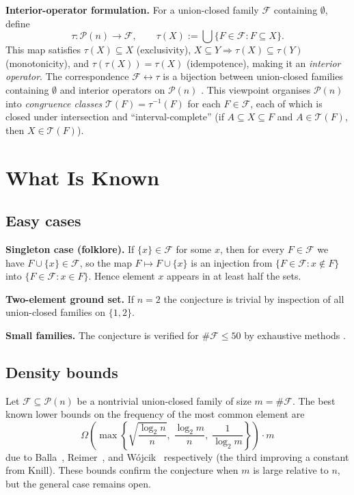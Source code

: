 \documentclass[11pt]{article}
\theoremstyle{definition}
\theoremstyle{remark}
\newcommand{\F}{\mathcal{F}}
\newcommand{\Pow}{\mathcal{P}}
\begin{document}
\textbf{Interior-operator formulation.}
For a union-closed family $\F$ containing $\emptyset$, define
\[
  \tau : \Pow(n) \to \F, \qquad \tau(X) := \bigcup\{F \in \F : F \subseteq X\}.
\]
This map satisfies $\tau(X) \subseteq X$ (exclusivity),
$X \subseteq Y \Rightarrow \tau(X)\subseteq\tau(Y)$ (monotonicity),
and $\tau(\tau(X)) = \tau(X)$ (idempotence), making it an
\emph{interior operator}.
The correspondence $\F \leftrightarrow \tau$ is a bijection between
union-closed families containing $\emptyset$ and interior operators on
$\Pow(n)$ \cite{nagel2023}.
This viewpoint organises $\Pow(n)$ into \emph{congruence classes}
$\mathcal{T}(F) = \tau^{-1}(F)$ for each $F \in \F$, each of which is
closed under intersection and ``interval-complete'' (if $A \subseteq X \subseteq F$
and $A \in \mathcal{T}(F)$, then $X \in \mathcal{T}(F)$).

\section{What Is Known}

\subsection{Easy cases}
\label{sec:easy}

\textbf{Singleton case (folklore).}
If $\{x\} \in \F$ for some $x$, then for every $F \in \F$ we have
$F \cup \{x\} \in \F$, so the map $F \mapsto F \cup \{x\}$ is an
injection from $\{F \in \F : x \notin F\}$ into $\{F \in \F : x \in F\}$.
Hence element $x$ appears in at least half the sets.

\textbf{Two-element ground set.}
If $n = 2$ the conjecture is trivial by inspection of all union-closed
families on $\{1,2\}$.

\textbf{Small families.}
The conjecture is verified for $\#\F \le 50$ by exhaustive methods
\cite{bruhn2015}.

\subsection{Density bounds}

Let $\F \subseteq \Pow(n)$ be a nontrivial union-closed family of size
$m = \#\F$.
The best known lower bounds on the frequency of the most common element are
\[
  \Omega\!\left(\max\!\left\{\sqrt{\frac{\log_2 n}{n}},\;
    \frac{\log_2 m}{n},\; \frac{1}{\log_2 m}\right\}\right) \cdot m
\]
due to Balla~\cite{balla2011}, Reimer~\cite{reimer2003}, and
W\'{o}jcik~\cite{wojcik1999} respectively (the third improving a
constant from Knill).
These bounds confirm the conjecture when $m$ is large relative to $n$,
but the general case remains open.
\end{document}
